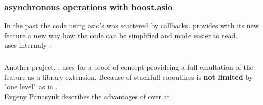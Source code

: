 \subsubsection*{asynchronous operations with boost.asio}
In the past the code using asio's \asyncops was scattered by callbacks.
\boostasio provides with its new feature \asyncres a new way how the code can be
simplified and made easier to read.\\
\yieldcontext uses internaly \boostcoroutine:

\subsubsection*{\csharp \await}
Another project, \awaitemu, uses \boostcoroutine for a proof-of-concept
provideing a full emultation of the \csharp feature \await as a library
extension. Because of stackfull coroutines \await is \textbf{not limited} by
"one level" as in \csharp.\\
Evgeny Panasyuk describes the advantages of \boostcoroutine over \await at
\channelnine.
